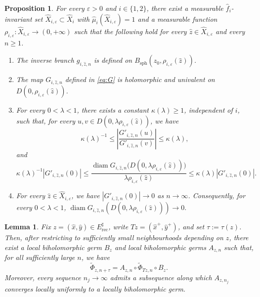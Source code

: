 \documentclass[10pt,a4paper]{amsart}
\newtheorem{prop}{Proposition}
\newtheorem{lem}{Lemma}
\begin{document}
\begin{prop}
\label{prop:inverse branch-package}
For every $\varepsilon>0$ and $i\in\{1,2\}$, there exist a measurable
$\hat f_i$-invariant set
$\hat X_{i,\varepsilon}\subset\hat X_i$ with
$\hat\mu_i(\hat X_{i,\varepsilon})=1$ and a measurable function
$\rho_{i,\varepsilon}\colon
\hat X_{i,\varepsilon}\to(0,+\infty)$
such that the following hold for every
$\hat z\in\hat X_{i,\varepsilon}$ and every $n\geq1$.

\begin{enumerate}
\item
The inverse branch $g_{i,\hat z,n}$ is defined on
$B_{\mathrm{sph}}(z_0,\rho_{i,\varepsilon}(\hat z))$.

\item
The map $G_{i,\hat z,n}$ defined in \eqref{eq:G} is holomorphic and
univalent on
$D(0,\rho_{i,\varepsilon}(\hat z))$.

\item
For every $0<\lambda<1$, there exists a constant
$\kappa(\lambda)\geq1$, independent of $i$, such that, for every
$u,v\in
D(0,\lambda\rho_{i,\varepsilon}(\hat z))$,
we have
$$
\kappa(\lambda)^{-1}
\leq
\left|
\frac{G'_{i,\hat z,n}(u)}
     {G'_{i,\hat z,n}(v)}
\right|
\leq
\kappa(\lambda),
$$
and
$$
\kappa(\lambda)^{-1}|G'_{i,\hat z,n}(0)|
\leq
\frac{
\operatorname{diam}
G_{i,\hat z,n}
\bigl(D(0,\lambda\rho_{i,\varepsilon}(\hat z))\bigr)
}{
\lambda\rho_{i,\varepsilon}(\hat z)
}
\leq
\kappa(\lambda)|G'_{i,\hat z,n}(0)|.
$$

\item
For every $\hat z\in\hat X_{i,\varepsilon}$, we have
$
|G'_{i,\hat z,n}(0)|\to0
$
as $n\to\infty$. Consequently, for every $0<\lambda<1$,
$
\operatorname{diam}
G_{i,\hat z,n}
(D(0,\lambda\rho_{i,\varepsilon}(\hat z)))\to0.
$
\end{enumerate}
\end{prop}

\begin{lem}\label{lem:return-equivar}
Fix $z=(\hat x,\hat y)\in E^\sharp_{\mathrm{rec}}$, write
$Tz=(\hat x^+,\hat y^+)$, and set $\tau:=\tau(z)$. Then, after
restricting to sufficiently small neighbourhoods depending on $z$,
there exist a local biholomorphic germ $B_z$ and local
biholomorphic germs $A_{z,n}$ such that, for all sufficiently large
$n$, we have
\begin{equation}\label{eq:tilde-gauge}
\widetilde\Phi_{z,n+\tau}
=
A_{z,n}\circ
\widetilde\Phi_{Tz,n}\circ B_z.
\end{equation}
Moreover, every sequence $n_j\to\infty$ admits a subsequence along
which $A_{z,n_j}$ converges locally uniformly to a locally
biholomorphic germ.
\end{lem}
\end{document}
